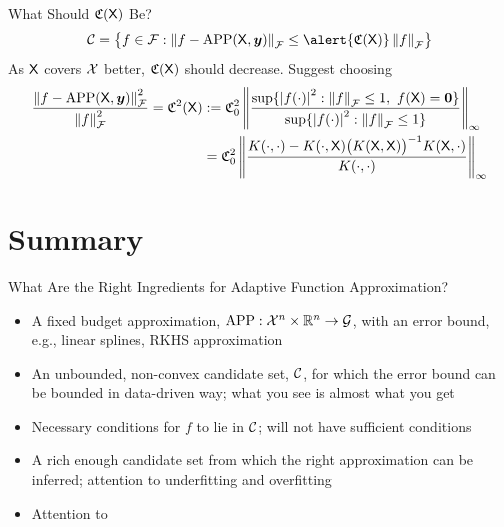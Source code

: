 \documentclass[10pt,compress,xcolor={usenames,dvipsnames},aspectratio=169]{beamer}
\DeclareMathOperator{\app}{APP}
\begin{document}
\begin{frame}{What Should $\mathfrak{C}(\mathsf{X})$ Be?}
	\[
	\cc  =  \bigl\{ f \in \cf :  \norm[\cf]{f - \app(\mX,\vy)} \le  \alert{\fC(\mX)} \norm[\cf]{f} \bigr\}
	\]
	As $\mathsf{X}$ covers $\mathcal{X}$ better, $\mathfrak{C}(\mathsf{X})$ should decrease.  Suggest choosing
	\begin{align*}
	\frac{ \norm[\cf]{f - \app(\mX,\vy)}^2 }{ \norm[\cf]{f}^2 } = \fC^2(\mX) & : = \fC_0^2 \norm[\infty]{\frac{\sup \{ \abs{f(\cdot)}^2 : \norm[\cf]{f} \le 1,   \ f(\mX) = \vzero  \}}{\sup \{ \abs{f(\cdot)}^2 : \norm[\cf]{f} \le 1 \}}} \\
	&  = \fC_0^2  \norm[\infty]{\frac{K(\cdot,\cdot) -  K(\cdot,\mX)\bigl(K(\mX,\mX) \bigr)^{-1} K(\mX, \cdot)}{K(\cdot,\cdot)}}
	\end{align*}
	

\end{frame}


\section{Summary}

\begin{frame}
	{What Are the Right Ingredients for Adaptive Function Approximation?}
	
	\begin{itemize}
		\item A fixed budget \alert{approximation}, $\app : \cx^n \times \reals^n \to \cg$, with an error bound, e.g., linear splines, RKHS approximation
		
		\item An unbounded, non-convex \alert{candidate set}, $\mathcal{C}$, for which the error bound can be bounded in \alert{data-driven} way; what you see is almost what you get
		
		\item \alert{Necessary} conditions for $f$ to lie in $\mathcal{C}$; will not have sufficient conditions
		
		\item A rich enough candidate set from which the right approximation can be \alert{inferred}; attention to underfitting and overfitting
		
		\item Attention to 
		
	\end{itemize}


\end{frame}
\end{document}
